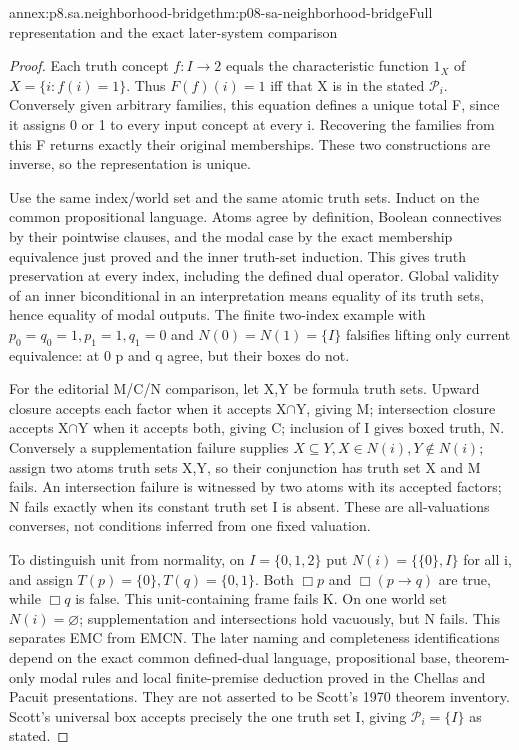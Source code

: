\begin{annexitem}{annex:p8.sa.neighborhood-bridge}{thm:p08-sa-neighborhood-bridge}{Full representation and the exact later-system comparison}
\begin{proof}
Each truth concept \(f:I\to2\) equals the characteristic
function \(1_X\) of \(X=\{i:f(i)=1\}\). Thus
\(F(f)(i)=1\) iff that X is in the stated
\(\mathscr P_i\). Conversely given arbitrary families,
this equation defines a unique total F, since it assigns 0
or 1 to every input concept at every i. Recovering the families
from this F returns exactly their original memberships. These
two constructions are inverse, so the representation is unique.

Use the same index/world set and the same atomic truth sets.
Induct on the common propositional language. Atoms agree by
definition, Boolean connectives by their pointwise clauses,
and the modal case by the exact membership equivalence just
proved and the inner truth-set induction. This gives truth
preservation at every index, including the defined dual operator.
Global validity of an inner biconditional in an interpretation
means equality of its truth sets, hence equality of modal outputs.
The finite two-index example with \(p_0=q_0=1,p_1=1,q_1=0\)
and \(N(0)=N(1)=\{I\}\) falsifies lifting only current
equivalence: at 0 p and q agree, but their boxes do not.

For the editorial M/C/N comparison, let X,Y be formula truth sets.
Upward closure accepts each factor when it accepts X\(\cap\)Y,
giving M; intersection closure accepts X\(\cap\)Y when it
accepts both, giving C; inclusion of I gives boxed truth, N.
Conversely a supplementation failure supplies
\(X\subseteq Y,X\in N(i),Y\notin N(i)\); assign two atoms
truth sets X,Y, so their conjunction has truth set X and M fails.
An intersection failure is witnessed by two atoms with its
accepted factors; N fails exactly when its constant truth set
I is absent. These are all-valuations converses, not conditions
inferred from one fixed valuation.

To distinguish unit from normality, on \(I=\{0,1,2\}\)
put \(N(i)=\{\{0\},I\}\) for all i, and assign
\(T(p)=\{0\},T(q)=\{0,1\}\). Both \(\Box p\)
and \(\Box(p\to q)\) are true, while \(\Box q\) is
false. This unit-containing frame fails K. On one world set
\(N(i)=\varnothing\); supplementation and intersections
hold vacuously, but N fails. This separates EMC from EMCN.
The later naming and completeness identifications depend on
the exact common defined-dual language, propositional base,
theorem-only modal rules and local finite-premise deduction
proved in the Chellas and Pacuit presentations. They are not
asserted to be Scott's 1970 theorem inventory. Scott's universal
box accepts precisely the one truth set I, giving
\(\mathscr P_i=\{I\}\) as stated.
\end{proof}
\end{annexitem}

